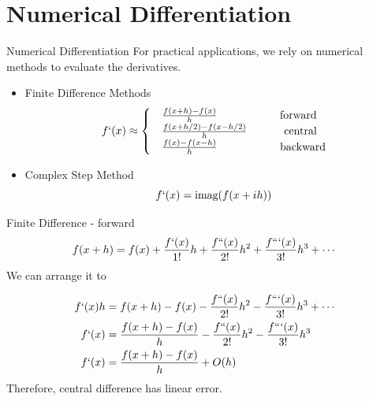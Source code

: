 \documentclass{beamer}
\begin{document}
\section{Numerical Differentiation}
\begin{frame}{Numerical Differentiation}
For practical applications, we rely on numerical methods to evaluate the derivatives.

\begin{itemize}
     \item Finite Difference Methods
     \begin{equation*}
         f`(x) \approx
    \begin{cases}
         & \frac{f(x+h)-f(x)}{h} ~~~~~~~~~~~~~~~~~\textrm{forward} \\
         & \frac{f(x+h/2)-f(x-h/2)}{h} ~~~~~~~~~~\textrm{central}\\
         & \frac{f(x)-f(x-h)}{h} ~~~~~~~~~~~~~~~~~\textrm{backward}    
     \end{cases}
     \end{equation*}
     \item Complex Step Method
     \begin{equation*}
         f`(x) = \textrm{imag}(f(x+ih))
     \end{equation*}
\end{itemize}
\end{frame}

\begin{frame}{Finite Difference - forward}
\begin{equation*}
    f(x+h) = f(x) + \frac{f`(x)}{1!}h + \frac{f``(x)}{2!}h^2 + \frac{f```(x)}{3!}h^3 + \cdots 
\end{equation*}
We can arrange it to 

\begin{equation*}
\begin{split}
    f`(x)h &= f(x+h) - f(x) - \frac{f``(x)}{2!}h^2  - \frac{f```(x)}{3!}h^3 + \cdots \\
    f`(x) &= \frac{f(x+h) - f(x)}{h} - \frac{f``(x)}{2!}h^2  - \frac{f```(x)}{3!}h^3 \\
    f`(x) &= \frac{f(x+h) - f(x)}{h} + O(h)       
\end{split}
\end{equation*}
Therefore, central difference has linear error.
\end{frame}
\end{document}
